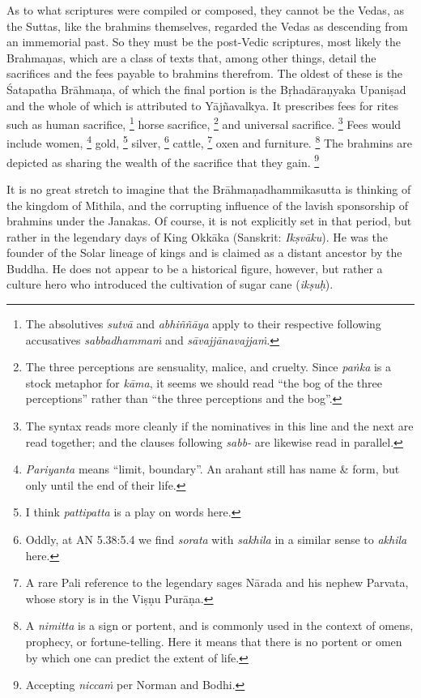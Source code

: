 \documentclass[12pt,openany]{book}%
\begin{document}
As to what scriptures were compiled or composed, they cannot be the Vedas, as the Suttas, like the brahmins themselves, regarded the Vedas as descending from an immemorial past. So they must be the post-Vedic scriptures, most likely the \textsanskrit{Brahmaṇas}, which are a class of texts that, among other things, detail the sacrifices and the fees payable to brahmins therefrom. The oldest of these is the Śatapatha \textsanskrit{Brāhmaṇa}, of which the final portion is the \textsanskrit{Bṛhadāraṇyaka} \textsanskrit{Upaniṣad} and the whole of which is attributed to \textsanskrit{Yājñavalkya}. It prescribes fees for rites such as human sacrifice, \footnote{The absolutives \textit{\textsanskrit{sutvā}} and \textit{\textsanskrit{abhiññāya}} apply to their respective following accusatives \textit{\textsanskrit{sabbadhammaṁ}} and \textit{\textsanskrit{sāvajjānavajjaṁ}}. } horse sacrifice, \footnote{The three perceptions are sensuality, malice, and cruelty. Since \textit{\textsanskrit{paṅka}} is  a stock metaphor for \textit{\textsanskrit{kāma}}, it seems we should read “the bog of the three perceptions” rather than “the three perceptions and the bog”. } and universal sacrifice. \footnote{The syntax reads more cleanly if the nominatives in this line and the next are read together; and the clauses following \textit{sabb-} are likewise read in parallel. } Fees would include women, \footnote{\textit{Pariyanta} means “limit, boundary”. An arahant still has name \& form, but only until the end of their life. } gold, \footnote{I think \textit{pattipatta} is a play on words here. } silver, \footnote{Oddly, at AN 5.38:5.4 we find \textit{sorata} with \textit{sakhila} in a similar sense to \textit{akhila} here. } cattle, \footnote{A rare Pali reference to the legendary sages \textsanskrit{Nārada} and his nephew Parvata, whose story is in the \textsanskrit{Viṣṇu} \textsanskrit{Purāṇa}. } oxen and furniture. \footnote{A \textit{nimitta} is a sign or portent, and is commonly used in the context of omens, prophecy, or fortune-telling. Here it means that there is no portent or omen by which one can predict the extent of life. } The brahmins are depicted as sharing the wealth of the sacrifice that they gain. \footnote{Accepting \textit{\textsanskrit{niccaṁ}} per Norman and Bodhi. }

It is no great stretch to imagine that the \textsanskrit{Brāhmaṇadhammikasutta} is thinking of the kingdom of Mithila, and the corrupting influence of the lavish sponsorship of brahmins under the Janakas. Of course, it is not explicitly set in that period, but rather in the legendary days of King \textsanskrit{Okkāka} (Sanskrit: \textit{\textsanskrit{Ikṣvāku}}). He was the founder of the Solar lineage of kings and is claimed as a distant ancestor by the Buddha. He does not appear to be a historical figure, however, but rather a culture hero who introduced the cultivation of sugar cane (\textit{\textsanskrit{ikṣuḥ}}).
\end{document}
